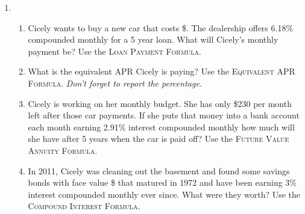 \begin{enumerate}
 \item \begin{enumerate} 
\item Cicely wants to buy a new car that costs \$.  The dealership offers 6.18\% compounded monthly for a 5 year loan.  What will Cicely's monthly payment be? Use the \textsc{Loan Payment Formula}.  \vfill %
\item What is the equivalent APR Cicely  is paying?  Use the \textsc{Equivalent APR Formula}.   \emph{Don't forget to report the percentage.} \vfill %
\item Cicely is working on her monthly budget.  She has only \$230 per month left after those car payments.  If she puts that money into a bank account each month earning 2.91\% interest compounded monthly how much will she have after 5 years when the car is paid off?  Use the \textsc{Future Value Annuity Formula}.  \vfill  %
\item In 2011, Cicely was cleaning out the basement and found some savings bonds with face value \$ that matured in 1972 and have been earning 3\% interest compounded monthly ever since.  What were they worth? Use the \textsc{Compound Interest Formula}. \vfill  %
\end{enumerate}


\end{enumerate}


